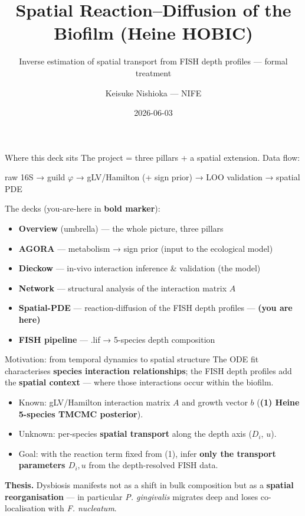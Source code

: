\documentclass[
  ignorenonframetext,
  aspectratio=169,
]{beamer}
\title{Spatial Reaction--Diffusion of the Biofilm (Heine HOBIC)}
\subtitle{Inverse estimation of spatial transport from FISH depth
profiles --- formal treatment}
\author{Keisuke Nishioka --- NIFE}
\date{2026-06-03}
\providecommand{\tightlist}{%
  \setlength{\itemsep}{0pt}\setlength{\parskip}{0pt}}
\begin{document}
\frame{\titlepage}

\begin{frame}{Where this deck sits}
\protect\hypertarget{where-this-deck-sits}{}
The project = three pillars + a spatial extension. Data flow:

raw 16S → guild \(\varphi\) → gLV/Hamilton (+ sign prior) → LOO
validation → spatial PDE

The decks (you-are-here in \textbf{bold marker}):

\begin{itemize}
\tightlist
\item
  \textbf{Overview} (umbrella) --- the whole picture, three pillars
\item
  \textbf{AGORA} --- metabolism → sign prior (input to the ecological
  model)
\item
  \textbf{Dieckow} --- in-vivo interaction inference \& validation (the
  model)
\item
  \textbf{Network} --- structural analysis of the interaction matrix
  \(A\)
\item
  \textbf{Spatial-PDE} --- reaction-diffusion of the FISH depth profiles
  --- \textbf{(you are here)}
\item
  \textbf{FISH pipeline} --- .lif → 5-species depth composition
\end{itemize}
\end{frame}

\begin{frame}{Motivation: from temporal dynamics to spatial structure}
\protect\hypertarget{motivation-from-temporal-dynamics-to-spatial-structure}{}
The ODE fit characterises \textbf{species interaction relationships};
the FISH depth profiles add the \textbf{spatial context} --- where those
interactions occur within the biofilm.

\begin{itemize}
\tightlist
\item
  Known: gLV/Hamilton interaction matrix \(A\) and growth vector \(b\)
  (\textbf{(1) Heine 5-species TMCMC posterior}).
\item
  Unknown: per-species \textbf{spatial transport} along the depth axis
  (\(D_i\), \(u\)).
\item
  Goal: with the reaction term fixed from (1), infer \textbf{only the
  transport parameters \(D_i,u\)} from the depth-resolved FISH data.
\end{itemize}

\vspace{0.4em}

\textbf{Thesis.} Dysbiosis manifests not as a shift in bulk composition
but as a \textbf{spatial reorganisation} --- in particular \emph{P.
gingivalis} migrates deep and loses co-localisation with \emph{F.
nucleatum}.
\end{frame}
\end{document}
